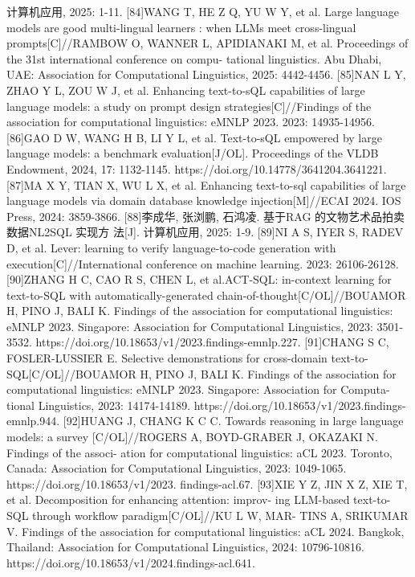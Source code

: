 \documentclass[12pt,a4paper,openright,UTF8]{ctexbook}
\begin{document}
计算机应用, 2025: 1-11.
[84]WANG T, HE Z Q, YU W Y, et al. Large language models are good multi-lingual
learners : when LLMs meet cross-lingual prompts[C]//RAMBOW O, WANNER L,
APIDIANAKI M, et al. Proceedings of the 31st international conference on compu-
tational linguistics. Abu Dhabi, UAE: Association for Computational Linguistics,
2025: 4442-4456.
[85]NAN L Y, ZHAO Y L, ZOU W J, et al. Enhancing text-to-sQL capabilities of
large language models: a study on prompt design strategies[C]//Findings of the
association for computational linguistics: eMNLP 2023. 2023: 14935-14956.
[86]GAO D W, WANG H B, LI Y L, et al. Text-to-sQL empowered by large language
models: a benchmark evaluation[J/OL]. Proceedings of the VLDB Endowment,
2024, 17: 1132-1145. https://doi.org/10.14778/3641204.3641221.
[87]MA X Y, TIAN X, WU L X, et al. Enhancing text-to-sql capabilities of large
language models via domain database knowledge injection[M]//ECAI 2024. IOS
Press, 2024: 3859-3866.
[88]李成华, 张浏鹏, 石鸿凌. 基于RAG 的文物艺术品拍卖数据NL2SQL 实现方
法[J]. 计算机应用, 2025: 1-9.
[89]NI A S, IYER S, RADEV D, et al. Lever: learning to verify language-to-code
generation with execution[C]//International conference on machine learning. 2023:
26106-26128.
[90]ZHANG H C, CAO R S, CHEN L, et al.ACT-SQL: in-context learning for
text-to-SQL with automatically-generated chain-of-thought[C/OL]//BOUAMOR
H, PINO J, BALI K. Findings of the association for computational linguistics:
eMNLP 2023. Singapore: Association for Computational Linguistics, 2023: 3501-
3532. https://doi.org/10.18653/v1/2023.findings-emnlp.227.
[91]CHANG S C, FOSLER-LUSSIER E. Selective demonstrations for cross-domain
text-to-SQL[C/OL]//BOUAMOR H, PINO J, BALI K. Findings of the association
for computational linguistics: eMNLP 2023. Singapore: Association for Computa-
tional Linguistics, 2023: 14174-14189. https://doi.org/10.18653/v1/2023.findings-
emnlp.944.
[92]HUANG J, CHANG K C C. Towards reasoning in large language models: a survey
[C/OL]//ROGERS A, BOYD-GRABER J, OKAZAKI N. Findings of the associ-
ation for computational linguistics: aCL 2023. Toronto, Canada: Association for
Computational Linguistics, 2023: 1049-1065. https://doi.org/10.18653/v1/2023.
findings-acl.67.
[93]XIE Y Z, JIN X Z, XIE T, et al. Decomposition for enhancing attention: improv-
ing LLM-based text-to-SQL through workflow paradigm[C/OL]//KU L W, MAR-
TINS A, SRIKUMAR V. Findings of the association for computational linguistics:
aCL 2024. Bangkok, Thailand: Association for Computational Linguistics, 2024:
10796-10816. https://doi.org/10.18653/v1/2024.findings-acl.641.
\end{document}
